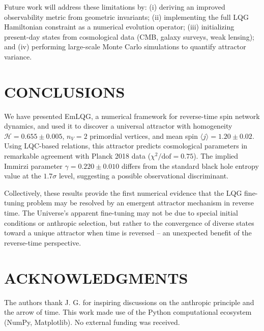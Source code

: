 \documentclass[twocolumn,aps,prd,showpacs,preprintnumbers,longbibliography]{revtex4-2}
\begin{document}
	Future work will address these limitations by: (i) deriving an improved observability metric from geometric invariants; (ii) implementing the full LQG Hamiltonian constraint as a numerical evolution operator; (iii) initializing present-day states from cosmological data (CMB, galaxy surveys, weak lensing); and (iv) performing large-scale Monte Carlo simulations to quantify attractor variance.
	
	\section{CONCLUSIONS}
	
	We have presented EmLQG, a numerical framework for reverse-time spin network dynamics, and used it to discover a universal attractor with homogeneity $\mathcal{H} = 0.655 \pm 0.005$, $n_V=2$ primordial vertices, and mean spin $\langle j \rangle = 1.20 \pm 0.02$. Using LQC-based relations, this attractor predicts cosmological parameters in remarkable agreement with Planck 2018 data ($\chi^2/\text{dof} = 0.75$). The implied Immirzi parameter $\gamma = 0.220 \pm 0.010$ differs from the standard black hole entropy value at the $1.7\sigma$ level, suggesting a possible observational discriminant.
	
	Collectively, these results provide the first numerical evidence that the LQG fine-tuning problem may be resolved by an emergent attractor mechanism in reverse time. The Universe's apparent fine-tuning may not be due to special initial conditions or anthropic selection, but rather to the convergence of diverse states toward a unique attractor when time is reversed -- an unexpected benefit of the reverse-time perspective.
	
	\section*{ACKNOWLEDGMENTS}
	
	The authors thank J. G. for inspiring discussions on the anthropic principle and the arrow of time. This work made use of the Python computational ecosystem (NumPy, Matplotlib). No external funding was received.
	
\end{document}
